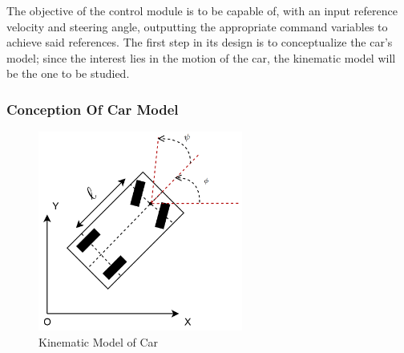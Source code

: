 The objective of the control module is to be capable of, with an input reference velocity and steering angle, outputting the appropriate command variables to achieve said references. The first step in its design is to conceptualize the car's model; since the interest lies in the motion of the car, the kinematic model will be the one to be studied.
\subsubsection{Conception Of Car Model}
\label{sec:concep}

\begin{figure}[!htbp]
\centering
       \includegraphics[page=1,width=0.6\textwidth]{img/kinematicModel.png} 
\caption{Kinematic Model of Car}%
\label{fig:kinModel}
\end{figure}

